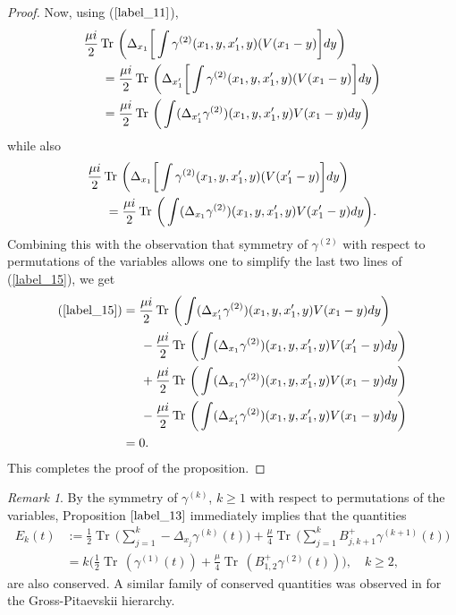 \documentclass[reqno]{amsart}
\numberwithin{equation}{section}
\theoremstyle{remark}
\newtheorem{remark}[theorem]{Remark}
\DeclareMathOperator{\Tr}{Tr\,}
\begin{document}
\begin{proof}
Now, using ($\ref{label_11}$),
\begin{align*}
&\frac{\mu i}{2}\Tr\bigg(\Delta_{x_1}\bigg[\int \gamma^{(2)}(x_1,y,x'_1,y)(V(x_1-y)\bigg]dy\bigg)\\
&\hspace{0.2in}=\frac{\mu i}{2}\Tr\bigg(\Delta_{x'_1}\bigg[\int \gamma^{(2)}(x_1,y,x'_1,y)(V(x_1-y)\bigg]dy\bigg)\\
&\hspace{0.2in}=\frac{\mu i}{2}\Tr\bigg(\int (\Delta_{x'_1}\gamma^{(2)})(x_1,y,x'_1,y)V(x_1-y)dy\bigg)
\end{align*}
while also
\begin{align*}
&\frac{\mu i}{2}\Tr\bigg(\Delta_{x_1}\bigg[\int \gamma^{(2)}(x_1,y,x'_1,y)(V(x'_1-y)\bigg]dy\bigg)\\
&\hspace{0.2in}=\frac{\mu i}{2}\Tr\bigg(\int (\Delta_{x_1}\gamma^{(2)})(x_1,y,x'_1,y)V(x'_1-y)dy\bigg).
\end{align*}
Combining this with the observation that symmetry of $\gamma^{(2)}$ with respect to permutations of the variables allows one to simplify the last two lines of (\ref{label_15}), we get
\begin{align*}
(\ref{label_15})&=\frac{\mu i}{2}\Tr\bigg(\int (\Delta_{x'_1}\gamma^{(2)})(x_1,y,x'_1,y)V(x_1-y)dy\bigg)\\
&\hspace{0.2in}-\frac{\mu i}{2}\Tr\bigg(\int (\Delta_{x_1}\gamma^{(2)})(x_1,y,x'_1,y)V(x'_1-y)dy\bigg)\\
&\hspace{0.2in}+\frac{\mu i}{2}\Tr\bigg(\int (\Delta_{x_1}\gamma^{(2)})(x_1,y,x'_1,y)V(x_1-y)dy\bigg)\\
&\hspace{0.2in}-\frac{\mu i}{2}\Tr\bigg(\int (\Delta_{x'_1}\gamma^{(2)})(x_1,y,x'_1,y)V(x_1-y)dy\bigg)\\
&=0.
\end{align*}
This completes the proof of the proposition.
\end{proof}

\begin{remark}
By the symmetry of $\gamma^{(k)}$, $k\geq 1$ with respect to permutations of the variables, Proposition $\ref{label_13}$ immediately implies that the quantities 
\begin{align*}
E_k(t)&:=\frac{1}{2}\Tr\bigg(\sum_{j=1}^k -\Delta_{x_j}\gamma^{(k)}(t)\bigg)+\frac{\mu}{4}\Tr\bigg(\sum_{j=1}^k B_{j,k+1}^+\gamma^{(k+1)}(t)\bigg)\\
&=k\bigg(\frac{1}{2}\Tr(\gamma^{(1)}(t))+\frac{\mu}{4}\Tr(B^+_{1,2}\gamma^{(2)}(t))\bigg),\quad k\geq 2,
\end{align*}
are also conserved.  A similar family of conserved quantities was observed in \cite{CPT} for the Gross-Pitaevskii hierarchy.
\end{remark}
\end{document}
